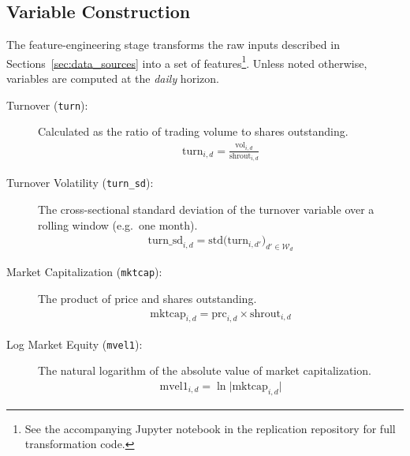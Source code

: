 \subsection{Variable Construction}\label{sec:var_construct}
The feature-engineering stage transforms the raw inputs described in Sections~\ref{sec:data_sources} into a set of features\footnote{See the accompanying Jupyter notebook in the replication repository for full transformation code.}. Unless noted otherwise, variables are computed at the \emph{daily} horizon.

\begin{description}
  \item[Turnover (\texttt{turn}):]  
    Calculated as the ratio of trading volume to shares outstanding.
    \begin{equation}
    \label{eq:turn}
    \begin{split}
    \text{turn}_{i,d} = \frac{\text{vol}_{i,d}}{\text{shrout}_{i,d}}
    \end{split}
    \end{equation}

  \item[Turnover Volatility (\texttt{turn\_sd}):]  
    The cross-sectional standard deviation of the turnover variable over a rolling window (e.g.\ one month).
    \begin{equation}
    \label{eq:turn_sd}
    \begin{split}
    \text{turn\_sd}_{i,d} = \mathrm{std}\bigl(\text{turn}_{i,d'}\bigr)_{d' \in \mathcal{W}_d}
    \end{split}
    \end{equation}

  \item[Market Capitalization (\texttt{mktcap}):]  
    The product of price and shares outstanding.
    \begin{equation}
    \label{eq:mktcap}
    \begin{split}
    \text{mktcap}_{i,d} = \text{prc}_{i,d}\times \text{shrout}_{i,d}
    \end{split}
    \end{equation}

  \item[Log Market Equity (\texttt{mvel1}):]  
    The natural logarithm of the absolute value of market capitalization.
    \begin{equation}
    \label{eq:mvel1}
    \begin{split}
    \text{mvel1}_{i,d} = \ln\bigl|\text{mktcap}_{i,d}\bigr|
    \end{split}
    \end{equation}


\end{description}
